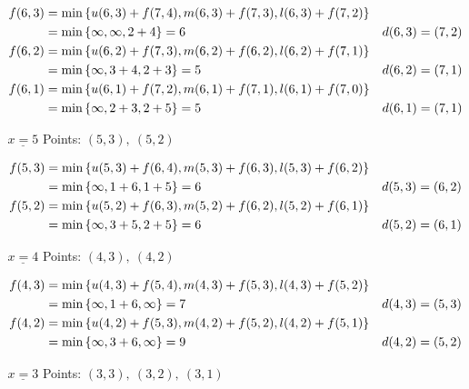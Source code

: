 \begin{prob}
\begin{enumerate}[label = {\textbf{(\greek*)}}]
\begin{sol}
\begin{itemize}
            $\begin{aligned}
            f(6,3) &= \min\left\{
            u(6,3)+f(7,4),m(6,3)+f(7,3),l(6,3)+f(7,2)\right\}\\
            &= \min\left\{\infty,\infty,2+4\right\} =6  & d(6,3)=(7,2)\\
            f(6,2) &= \min\left\{
            u(6,2)+f(7,3),m(6,2)+f(6,2),l(6,2)+f(7,1)\right\}\\
            &= \min\left\{\infty,3+4,2+3\right\} =5  & d(6,2)=(7,1)\\
            f(6,1) &= \min\left\{
            u(6,1)+f(7,2),m(6,1)+f(7,1),l(6,1)+f(7,0)\right\}\\
            &= \min\left\{\infty,2+3,2+5\right\} =5  & d(6,1)=(7,1)
            \end{aligned}$
            
            \item[$\underline{x=5}$] Points: $(5,3), \ (5,2)$
            
            $\begin{aligned}
            f(5,3) &= \min\left\{
            u(5,3)+f(6,4),m(5,3)+f(6,3),l(5,3)+f(6,2)\right\}\\
            &= \min\left\{\infty,1+6,1+5\right\} =6  & d(5,3)=(6,2)\\
            f(5,2) &= \min\left\{
            u(5,2)+f(6,3),m(5,2)+f(6,2),l(5,2)+f(6,1)\right\}\\
            &= \min\left\{\infty,3+5,2+5\right\} =6  & d(5,2)=(6,1)
            \end{aligned}$
            
            \item[$\underline{x=4}$] Points: $(4,3), \ (4,2)$
            
            $\begin{aligned}
            f(4,3) &= \min\left\{
            u(4,3)+f(5,4),m(4,3)+f(5,3),l(4,3)+f(5,2)\right\}\\
            &= \min\left\{\infty,1+6,\infty\right\} =7  & d(4,3)=(5,3)\\
            f(4,2) &= \min\left\{
            u(4,2)+f(5,3),m(4,2)+f(5,2),l(4,2)+f(5,1)\right\}\\
            &= \min\left\{\infty,3+6,\infty\right\} =9  & d(4,2)=(5,2)
            \end{aligned}$
            
            \item[$\underline{x=3}$] Points: $(3,3), \ (3,2), \ (3,1)$
            

\end{itemize}
\end{sol}
\end{enumerate}
\end{prob}
